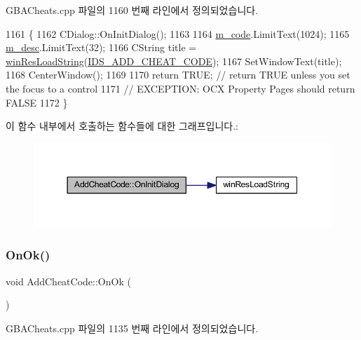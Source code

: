 G\+B\+A\+Cheats.\+cpp 파일의 1160 번째 라인에서 정의되었습니다.


\begin{DoxyCode}
1161 \{
1162   CDialog::OnInitDialog();
1163   
1164   \mbox{\hyperlink{class_add_cheat_code_a9ae1d05acf10bc6fc8ea8cce2ec2cc6a}{m\_code}}.LimitText(1024);
1165   \mbox{\hyperlink{class_add_cheat_code_a5bbe6b54e71db26da7b3abc7449b3342}{m\_desc}}.LimitText(32);
1166   CString title = \mbox{\hyperlink{_win_res_util_8cpp_a416e85e80ab9b01376e87251c83d1a5a}{winResLoadString}}(\mbox{\hyperlink{resource_8h_acb74efa1ecac0ed81d23602f6f68ce35}{IDS\_ADD\_CHEAT\_CODE}});
1167   SetWindowText(title);
1168   CenterWindow();
1169   
1170   \textcolor{keywordflow}{return} TRUE;  \textcolor{comment}{// return TRUE unless you set the focus to a control}
1171                 \textcolor{comment}{// EXCEPTION: OCX Property Pages should return FALSE}
1172 \}
\end{DoxyCode}
이 함수 내부에서 호출하는 함수들에 대한 그래프입니다.\+:
\nopagebreak
\begin{figure}[H]
\begin{center}
\leavevmode
\includegraphics[width=350pt]{class_add_cheat_code_a7818441d921e63c1b0983e86b60beeba_cgraph}
\end{center}
\end{figure}
\mbox{\label{class_add_cheat_code_a77b1ec1f5e067495aef92a2f9b8750c8}} 
\subsubsection{\texorpdfstring{On\+Ok()}{OnOk()}}
{\footnotesize\ttfamily void Add\+Cheat\+Code\+::\+On\+Ok (\begin{DoxyParamCaption}{ }\end{DoxyParamCaption})\hspace{0.3cm}{\ttfamily [protected]}}



G\+B\+A\+Cheats.\+cpp 파일의 1135 번째 라인에서 정의되었습니다.


